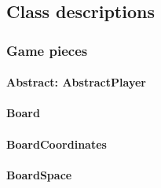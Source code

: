 \documentclass[12pt, letterpaper]{article}
\begin{document}



    \subsection{Class descriptions}




    \subsubsection{Game pieces}


    \paragraph{Abstract: AbstractPlayer}

    \paragraph{Board}

    \paragraph{BoardCoordinates}

    \paragraph{BoardSpace}
\end{document}

